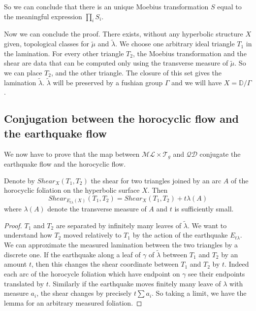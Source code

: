 So we can conclude that there is an unique Moebius transformation $S$ equal to the meaningful expression $\prod_i S_i$.

Now we can conclude the proof. There exists, without any hyperbolic structure $X$ given,  topological classes for $\tilde{\mu}$ and $\tilde{\lambda}$. We choose one arbitrary ideal triangle $T_1$ in the lamination. For every other triangle $T_2$, the Moebius transformation and the shear are data that can be computed only using the transverse measure of $\tilde{\mu}$. So we can place $T_2$, and the other triangle. The closure of this set gives the lamination $\tilde{\lambda}$. $\tilde{\lambda}$ will be preserved by a fushian group $\Gamma$ and we will have $X=\mathbb{D}  / \Gamma$.

\subsection{Conjugation between the horocyclic flow and the earthquake flow}

We now have to prove that the map between $\mathcal{ML}\times \mathcal{T}_g $ and $\mathcal{QD}$ conjugate the earthquake flow and the horocyclic flow.

\begin{lem}\label{LemDer}
Denote by $Shear_X(T_1,T_2)$ the shear for two triangles joined by an arc $A$ of the horocyclic foliation on the hyperbolic surface $X$. Then \[
Shear_{E_{t \lambda}(X)}(T_1 ,T_2)= Shear_X(T_1,T_2)+t \lambda(A)
\]
where $\lambda(A)$ denote the transverse measure of $A$ and $t$ is sufficiently small.
\end{lem}

\begin{proof}
$T_1$ and $T_2$ are separated by infinitely many leaves of $\tilde{\lambda}$. We want to understand how $T_2$ moved relatively to $T_1$ by the action of the earthquake $E_{t \lambda}$.
We can approximate the measured lamination between the two triangles by a discrete one.
If the earthquake along a leaf of $\gamma$ of $\tilde{\lambda}$ between $T_1$ and $T_2$ by an amount $t$, then this changes the shear coordinate between $T_1$ and $T_2$ by $t$. Indeed each arc of the horocycle foliation which have endpoint on $\gamma$ see their endpoints translated by $t$.
Similarly if the earthquake moves finitely many leave of $\lambda$ with measure $a_i$, the shear changes by precisely $t \sum a_i$. So taking a limit, we have the lemma for an arbitrary measured foliation.
\end{proof}

